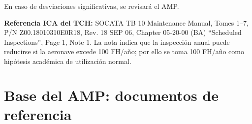 \documentclass[12pt]{article}
\newcommand{\FH}{FH}
\begin{document}
En caso de desviaciones significativas, se revisará el AMP.

\noindent\textbf{Referencia ICA del TCH:} SOCATA TB 10 Maintenance Manual, Tomes 1--7, P/N Z00.18010310E0R18, Rev. 18 SEP 06, Chapter 05-20-00 (BA) ``Scheduled Inspections'', Page 1, Note 1. La nota indica que la inspección anual puede reducirse si la aeronave excede 100 \FH/año; por ello se toma 100 \FH/año como hipótesis académica de utilización normal.

\section{Base del AMP: documentos de referencia}
\label{sec:documentos-referencia}

\begingroup
\small
\setlength{\tabcolsep}{4pt}
\renewcommand{\arraystretch}{1.18}
\end{document}
